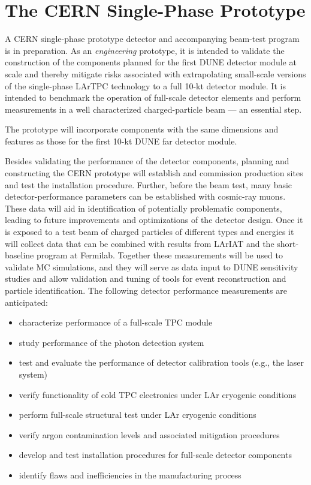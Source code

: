 \section{The CERN Single-Phase Prototype}
\label{sec:proto-cern-single}

A CERN single-phase prototype detector and accompanying beam-test
program is in preparation. As an \textit{engineering} prototype, it is
intended to validate the construction of the components planned for the
first DUNE  detector module at scale and thereby mitigate
risks associated with extrapolating small-scale versions of the
single-phase LArTPC technology to a full 10-kt detector module.  It is
intended to benchmark the operation of full-scale detector
elements and perform measurements in a well characterized
charged-particle beam --- an essential step.

The prototype will incorporate components with the same
dimensions and features as those for the first 10-kt DUNE far detector
module.

Besides validating the performance of the detector components,
planning and constructing the CERN prototype will establish and
commission production sites and test the installation procedure.
Further, before the beam test, many basic detector-performance
parameters can be established with cosmic-ray muons.  These data will
aid in identification of potentially problematic components, leading
to future improvements and optimizations of the detector design.
Once it is exposed to a test beam of charged particles of different
types and energies it will collect data that can be combined with
results from LArIAT and the short-baseline program at Fermilab. 
Together
these measurements will be used to validate MC simulations, and they
will serve as data input to DUNE sensitivity studies and allow
validation and tuning of tools for event reconstruction and particle
identification.
The following detector performance measurements are anticipated:
 \begin{itemize}
 \item characterize performance of a full-scale TPC module
 \item study performance of the photon detection system
 \item test and evaluate the performance of detector calibration tools (e.g., the laser system)
  \item verify functionality of cold TPC electronics under LAr cryogenic conditions
  \item perform full-scale structural test under LAr cryogenic conditions
  \item verify argon contamination levels and associated mitigation procedures
  \item develop and test installation procedures for full-scale detector components
  \item identify flaws and inefficiencies in the manufacturing process
\end{itemize}


